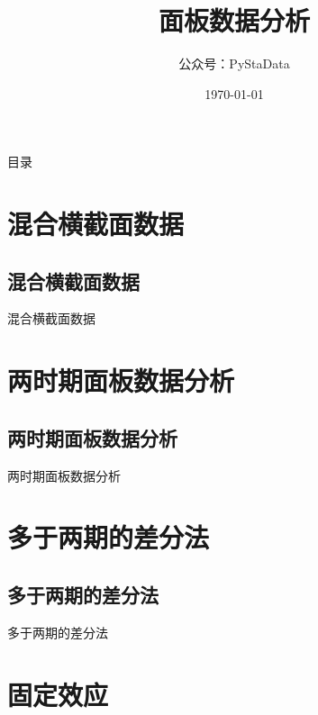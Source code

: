 \documentclass[UTF8]{ctexbeamer}
\begin{document}
\title{面板数据分析}
\author{公众号：PyStaData}
\date{\today}

\frame{\titlepage} %


\begin{frame}{目录}
\begin{multicols}{2}
  \tableofcontents
\end{multicols}
\end{frame}


\section{混合横截面数据}
\subsection{混合横截面数据}
\begin{frame}{混合横截面数据}
\end{frame}


\section{两时期面板数据分析}
\subsection{两时期面板数据分析}
\begin{frame}{两时期面板数据分析}
\end{frame}

\section{多于两期的差分法}
\subsection{多于两期的差分法}
\begin{frame}{多于两期的差分法}
\end{frame}


\section{固定效应}
\end{document}
